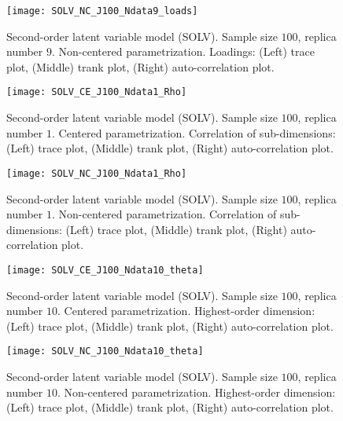 %
\begin{figure}[H]
	\centering
	\texttt{[image: SOLV\_NC\_J100\_Ndata9\_loads]}
	\caption[Second-order latent variable model (SOLV). Sample size $100$, replica number $9$. Non-centered parametrization. Loadings. Trace, trank and auto-correlation plots.]%
	{Second-order latent variable model (SOLV). Sample size $100$, replica number $9$. Non-centered parametrization. Loadings: (Left) trace plot, (Middle) trank plot, (Right) auto-correlation plot.}
	\label{fig:SOLV_NC_chains1}
\end{figure}
%
\begin{figure}[H]
	\centering
	\texttt{[image: SOLV\_CE\_J100\_Ndata1\_Rho]}
	\caption[Second-order latent variable model (SOLV). Sample size $100$, replica number $1$. Centered parametrization. Correlation of sub-dimensions. Trace, trank and auto-correlation plots.]%
	{Second-order latent variable model (SOLV). Sample size $100$, replica number $1$. Centered parametrization. Correlation of sub-dimensions: (Left) trace plot, (Middle) trank plot, (Right) auto-correlation plot.}
	\label{fig:SOLV_CE_chains2}
\end{figure}
%
\begin{figure}[H]
	\centering
	\texttt{[image: SOLV\_NC\_J100\_Ndata1\_Rho]}
	\caption[Second-order latent variable model (SOLV). Sample size $100$, replica number $1$. Non-centered parametrization. Correlation of sub-dimensions. Trace, trank and auto-correlation plots.]%
	{Second-order latent variable model (SOLV). Sample size $100$, replica number $1$. Non-centered parametrization. Correlation of sub-dimensions: (Left) trace plot, (Middle) trank plot, (Right) auto-correlation plot.}
	\label{fig:SOLV_NC_chains2}
\end{figure}
%
\begin{figure}[H]
	\centering
	\texttt{[image: SOLV\_CE\_J100\_Ndata10\_theta]}
	\caption[Second-order latent variable model (SOLV). Sample size $100$, replica number $10$. Centered parametrization. Highest-order dimension. Trace, trank and auto-correlation plots.]%
	{Second-order latent variable model (SOLV). Sample size $100$, replica number $10$. Centered parametrization. Highest-order dimension: (Left) trace plot, (Middle) trank plot, (Right) auto-correlation plot.}
	\label{fig:SOLV_CE_chains3}
\end{figure}
%
\begin{figure}[H]
	\centering
	\texttt{[image: SOLV\_NC\_J100\_Ndata10\_theta]}
	\caption[Second-order latent variable model (SOLV). Sample size $100$, replica number $10$. Non-centered parametrization. Highest-order dimension. Trace, trank and auto-correlation plots.]%
	{Second-order latent variable model (SOLV). Sample size $100$, replica number $10$. Non-centered parametrization. Highest-order dimension: (Left) trace plot, (Middle) trank plot, (Right) auto-correlation plot.}
	\label{fig:SOLV_NC_chains3}
\end{figure}
